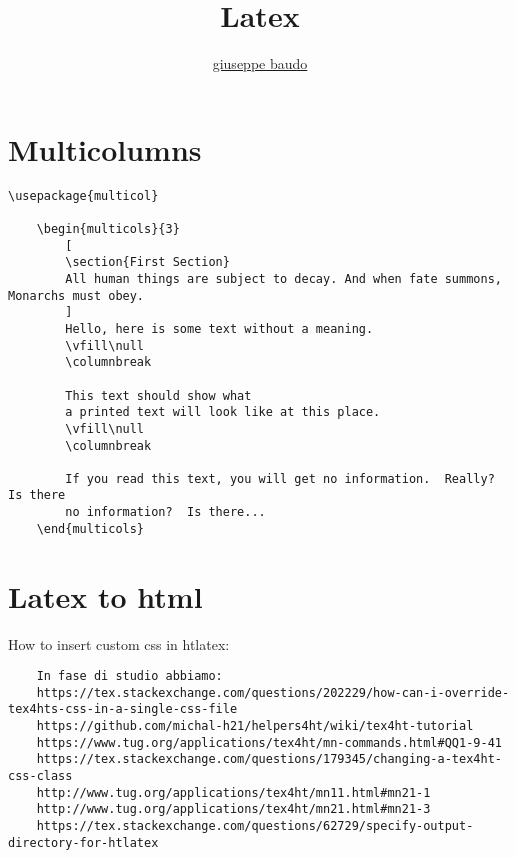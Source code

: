 \documentclass[a4paper,10pt]{article}
\title{Latex}
\author{\href{http://www.baudo.hol.es}{giuseppe baudo}}
\begin{document}
  


\maketitle

\section*{Multicolumns}

\begin{verbatim}
\usepackage{multicol}

	\begin{multicols}{3}
		[
		\section{First Section}
		All human things are subject to decay. And when fate summons, Monarchs must obey.
		]
		Hello, here is some text without a meaning.  
		\vfill\null			
		\columnbreak
		
		This text should show what 
		a printed text will look like at this place.
		\vfill\null
		\columnbreak		
		
		If you read this text, you will get no information.  Really?  Is there 
		no information?  Is there...
	\end{multicols}
\end{verbatim}

\section*{Latex to html}
How to insert custom css in htlatex: 

\begin{verbatim}
	In fase di studio abbiamo:
	https://tex.stackexchange.com/questions/202229/how-can-i-override-tex4hts-css-in-a-single-css-file
	https://github.com/michal-h21/helpers4ht/wiki/tex4ht-tutorial
	https://www.tug.org/applications/tex4ht/mn-commands.html#QQ1-9-41
	https://tex.stackexchange.com/questions/179345/changing-a-tex4ht-css-class
	http://www.tug.org/applications/tex4ht/mn11.html#mn21-1
	http://www.tug.org/applications/tex4ht/mn21.html#mn21-3	
	https://tex.stackexchange.com/questions/62729/specify-output-directory-for-htlatex
\end{verbatim}
\end{document}
